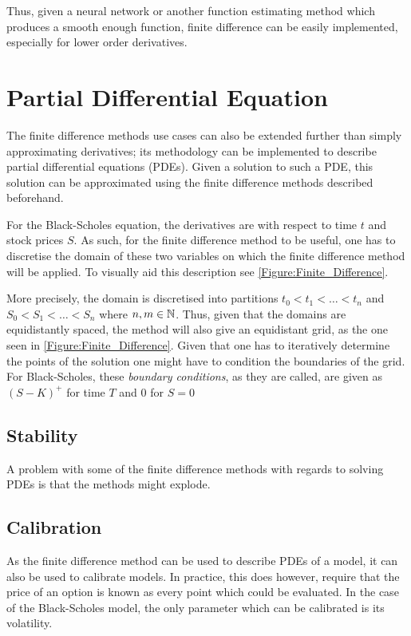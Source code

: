 Thus, given a neural network or another function estimating method which produces a smooth enough function, finite difference can be easily implemented, especially for lower order derivatives. 


\section{Partial Differential Equation}\label{Sec.Finite_Difference}
The finite difference methods use cases can also be extended further than simply approximating derivatives; its methodology can be implemented to describe partial differential equations (PDEs). Given a solution to such a PDE, this solution can be approximated using the finite difference methods described beforehand.

For the Black-Scholes equation, the derivatives are with respect to time $t$ and stock prices $S$. As such, for the finite difference method to be useful, one has to discretise the domain of these two variables on which the finite difference method will be applied. To visually aid this description see \autoref{Figure:Finite_Difference}.

More precisely, the domain is discretised into partitions $t_0<t_1<\dots<t_n$ and $S_0<S_1<\dots<S_n$ where $n,m\in\mathbb{N}$. Thus, given that the domains are equidistantly spaced, the method will also give an equidistant grid, as the one seen in \autoref{Figure:Finite_Difference}. Given that one has to iteratively determine the points of the solution one might have to condition the boundaries of the grid. For Black-Scholes, these \emph{boundary conditions}, as they are called, are given as $(S-K)^+$ for time $T$ and $0$ for $S=0$


\subsection{Stability}
A problem with some of the finite difference methods with regards to solving PDEs is that the methods might explode. 


\subsection{Calibration}
As the finite difference method can be used to describe PDEs of a model, it can also be used to calibrate models. In practice, this does however, require that the price of an option is known as every point which could be evaluated. In the case of the Black-Scholes model, the only parameter which can be calibrated is its volatility.